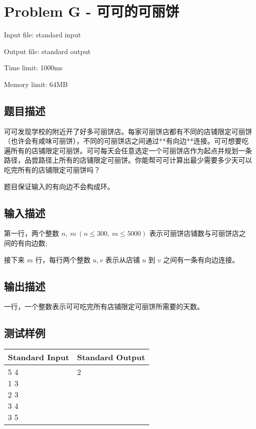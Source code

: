 \newpage
\section{Problem G - 可可的可丽饼}
{ \limitfont{}
Input file: standard input \par
Output file: standard output \par
Time limit: 1000ms \par
Memory limit: 64MB \par
}
\subsection*{题目描述}
可可发现学校的附近开了好多可丽饼店。每家可丽饼店都有不同的店铺限定可丽饼（也许会有咸味可丽饼），不同的可丽饼店之间通过**有向边**连接。可可想要吃遍所有的店铺限定可丽饼。可可每天会任意选定一个可丽饼店作为起点并规划一条路径，品尝路径上所有的店铺限定可丽饼。你能帮可可计算出最少需要多少天可以吃完所有的店铺限定可丽饼吗？

题目保证输入的有向边不会构成环。
\subsection*{输入描述}

第一行，两个整数 $n,\ m \ (n \le 300,\ m \le 5000)$ 表示可丽饼店铺数与可丽饼店之间的有向边数;

接下来 $m$ 行，每行两个整数 $u, v$ 表示从店铺 $u$ 到 $v$ 之间有一条有向边连接。

\subsection*{输出描述}

一行，一个整数表示可可吃完所有店铺限定可丽饼所需要的天数。

\subsection*{测试样例}

\begin{table}[H]
\begin{tabularx}{\textwidth}{|X|X|}
    \hline
    \textbf{Standard Input} & \textbf{Standard Output} \\ 
    \hline 
    \tablecell{
        5 4 \\ 
        1 3 \\
        2 3 \\
        3 4 \\
        3 5 \\
    } & 
    \tablecell{
        2 \\ \\ \\ \\ \\
    } \\
    \hline
\end{tabularx}
\end{table}
